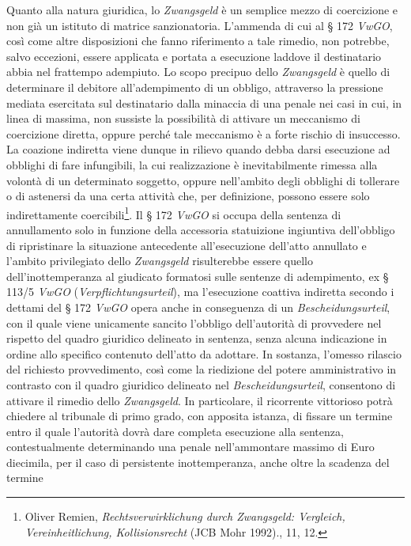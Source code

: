 \documentclass[12pt,it,a4paper,]{report}
\begin{document}
Quanto alla natura giuridica, lo \emph{Zwangsgeld} è un semplice mezzo
di coercizione e non già un istituto di matrice sanzionatoria. L'ammenda
di cui al § 172 \emph{VwGO}, così come altre disposizioni che fanno
riferimento a tale rimedio, non potrebbe, salvo eccezioni, essere
applicata e portata a esecuzione laddove il destinatario abbia nel
frattempo adempiuto. Lo scopo precipuo dello \emph{Zwangsgeld} è quello
di determinare il debitore all'adempimento di un obbligo, attraverso la
pressione mediata esercitata sul destinatario dalla minaccia di una
penale nei casi in cui, in linea di massima, non sussiste la possibilità
di attivare un meccanismo di coercizione diretta, oppure perché tale
meccanismo è a forte rischio di insuccesso. La coazione indiretta viene
dunque in rilievo quando debba darsi esecuzione ad obblighi di fare
infungibili, la cui realizzazione è inevitabilmente rimessa alla volontà
di un determinato soggetto, oppure nell'ambito degli obblighi di
tollerare o di astenersi da una certa attività che, per definizione,
possono essere solo indirettamente coercibili\footnote{{Oliver Remien,
  \emph{Rechtsverwirklichung durch Zwangsgeld: Vergleich,
  Vereinheitlichung, Kollisionsrecht} (JCB Mohr 1992).}, 11, 12.}. Il §
172 \emph{VwGO} si occupa della sentenza di annullamento solo in
funzione della accessoria statuizione ingiuntiva dell'obbligo di
ripristinare la situazione antecedente all'esecuzione dell'atto
annullato e l'ambito privilegiato dello \emph{Zwangsgeld} risulterebbe
essere quello dell'inottemperanza al giudicato formatosi sulle sentenze
di adempimento, ex § 113/5 \emph{VwGO} (\emph{Verpflichtungsurteil}), ma
l'esecuzione coattiva indiretta secondo i dettami del § 172 \emph{VwGO}
opera anche in conseguenza di un \emph{Bescheidungsurteil}, con il quale
viene unicamente sancito l'obbligo dell'autorità di provvedere nel
rispetto del quadro giuridico delineato in sentenza, senza alcuna
indicazione in ordine allo specifico contenuto dell'atto da adottare. In
sostanza, l'omesso rilascio del richiesto provvedimento, così come la
riedizione del potere amministrativo in contrasto con il quadro
giuridico delineato nel \emph{Bescheidungsurteil}, consentono di
attivare il rimedio dello \emph{Zwangsgeld}. In particolare, il
ricorrente vittorioso potrà chiedere al tribunale di primo grado, con
apposita istanza, di fissare un termine entro il quale l'autorità dovrà
dare completa esecuzione alla sentenza, contestualmente determinando una
penale nell'ammontare massimo di Euro diecimila, per il caso di
persistente inottemperanza, anche oltre la scadenza del termine
\end{document}

